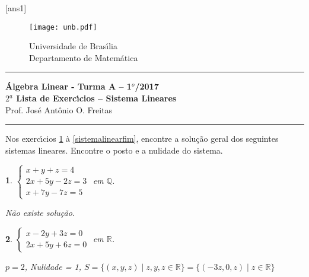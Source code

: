 \documentclass[12pt]{exam}
\newtheorem{exercicio}{}
\newcommand{\rac}{\mathbb{Q}}
\newcommand{\real}{\mathbb{R}}
\newcommand{\vesp}[1]{\vspace{ #1  cm}}
\begin{document}
\pagestyle{empty}

[ans1]

\begin{figure}[h]
        \begin{minipage}[c]{1.7cm}
        \texttt{[image: unb.pdf]}
        \end{minipage}%
        \hspace{0pt}
        \begin{minipage}[c]{4in}
          {Universidade de Bras{\'\i}lia} \\
          {Departamento de Matem{\'a}tica}
\end{minipage}
\end{figure}

\vesp{-0.35} \hrule

\begin{center}
{\Large\bf \'Algebra Linear - Turma A -- 1$^{o}$/2017} \\ \vspace{9pt} {\large\bf
  $2^{\underline{a}}$ Lista de Exerc{\'\i}cios -- Sistema Lineares}\\ \vspace{9pt} Prof. Jos{\'e} Ant{\^o}nio O. Freitas
\end{center}
\hrule

\vesp{.6}

Nos exerc{\'\i}cios \ref{sistemalinearinicio} \`a \ref{sistemalinearfim}, encontre a solu\c{c}\~ao geral dos seguintes sistemas lineares. Encontre o posto e a nulidade do sistema.
\begin{exercicio}\label{sistemalinearinicio}
$\begin{cases}
  x + y + z = 4\\
  2x + 5y - 2z = 3\\
  x + 7y - 7z = 5
\end{cases}$ em $\rac$.
\begin{solucao}
  N\~ao existe solu\c{c}\~ao.
\end{solucao}
\end{exercicio}

\begin{exercicio}
$\begin{cases}
  x - 2y + 3z = 0\\
  2x + 5y + 6z = 0
\end{cases}$ em $\real$.
\begin{solucao}
  $p = 2$, Nulidade = 1, $S = \{(x, y, z) \mid z, y, z \in \real\} = \{(-3z, 0, z) \mid z \in \real\}$
\end{solucao}
\end{exercicio}
\end{document}
